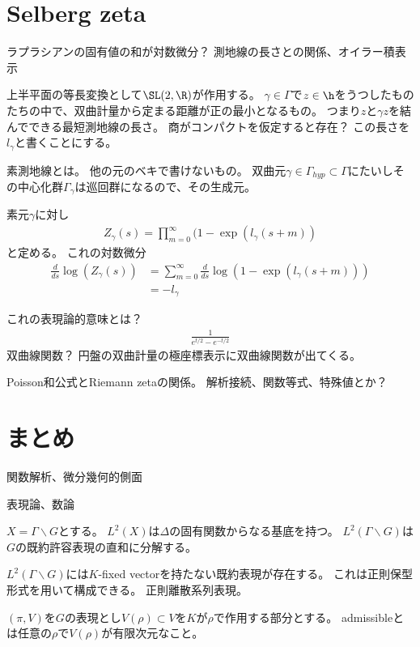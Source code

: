 \documentclass{jsarticle}
\begin{document}
\section{Selberg zeta}
ラプラシアンの固有値の和が対数微分？
測地線の長さとの関係、オイラー積表示

上半平面の等長変換として$\SL(2,\R)$が作用する。
$\gamma\in\Gamma$で$z\in \h$をうつしたものたちの中で、双曲計量から定まる距離が正の最小となるもの。
つまり$z$と$\gamma z$を結んでできる最短測地線の長さ。
商がコンパクトを仮定すると存在？
この長さを$l_\gamma$と書くことにする。

素測地線とは。
他の元のベキで書けないもの。
双曲元$\gamma\in\Gamma_{hyp}\subset \Gamma$にたいしその中心化群$\Gamma_\gamma$は巡回群になるので、その生成元。

素元$\gamma$に対し
\begin{align*}
Z_\gamma(s)=\prod^\infty_{m=0}(1-\exp(l_\gamma(s+m))
\end{align*}
と定める。
これの対数微分
\begin{align*}
\frac{d}{ds}\log(Z_\gamma(s))&=\sum^\infty_{m=0}\frac{d}{ds}\log(1-\exp(l_\gamma(s+m)))\\
&=-l_\gamma
\end{align*}

これの表現論的意味とは？
\begin{align*}
\frac{1}{e^{t/2}-e^{-t/2}}
\end{align*}
双曲線関数？
円盤の双曲計量の極座標表示に双曲線関数が出てくる。


Poisson和公式とRiemann zetaの関係。
解析接続、関数等式、特殊値とか？

\section{まとめ}
関数解析、微分幾何的側面

表現論、数論






\begin{thm}
$X=\Gamma\backslash G$とする。
$L^2(X)$は$\Delta$の固有関数からなる基底を持つ。
$L^2(\Gamma\backslash G)$は$G$の既約許容表現の直和に分解する。
\end{thm}
$L^2(\Gamma \backslash G)$には$K$-fixed vectorを持たない既約表現が存在する。
これは正則保型形式を用いて構成できる。
正則離散系列表現。



\begin{dfn}
$(\pi, V)$を$G$の表現とし$V(\rho)\subset V$を$K$が$\rho$で作用する部分とする。
admissibleとは任意の$\rho$で$V(\rho)$が有限次元なこと。
\end{dfn}
\end{document}
